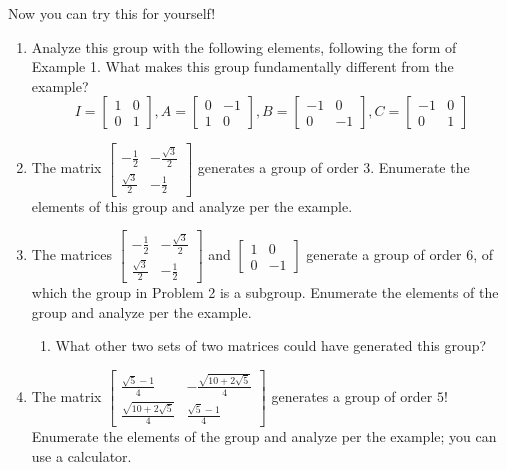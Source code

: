\documentclass[../gatm.tex]{subfiles}
\begin{document}
\noindent Now you can try this for yourself!
\begin{enumerate}
\item Analyze this group with the following elements, following the form of Example 1. What makes this group fundamentally different from the example?
$$I=\left[\begin{array}{cc} 1 & 0 \\ 0 & 1 \end{array}\right], A=\left[\begin{array}{cc} 0 & -1 \\ 1 & 0 \end{array}\right], B=\left[\begin{array}{cc} -1 & 0 \\ 0 & -1 \end{array}\right], C=\left[\begin{array}{cc} -1 & 0 \\ 0 & 1 \end{array}\right]$$
\item The matrix $\left[\begin{array}{cc} -\frac{1}{2} & -\frac{\sqrt{3}}{2} \\ \frac{\sqrt{3}}{2} & -\frac{1}{2}\end{array}\right]$ generates a group of order $3$. Enumerate the elements of this group and analyze per the example.
\item The matrices $\left[\begin{array}{cc} -\frac{1}{2} & -\frac{\sqrt{3}}{2} \\ \frac{\sqrt{3}}{2} & -\frac{1}{2}\end{array}\right]$ and $\left[\begin{array}{cc} 1 & 0 \\ 0 & -1 \end{array}\right]$ generate a group of order $6$, of which the group in Problem 2 is a subgroup. Enumerate the elements of the group and analyze per the example.
\begin{enumerate}
\item What other two sets of two matrices could have generated this group?
\end{enumerate}
\item The matrix $\left[\begin{array}{cc} \frac{\sqrt{5}-1}{4} & -\frac{\sqrt{10+2\sqrt{5}}}{4} \\ \frac{\sqrt{10+2\sqrt{5}}}{4} & \frac{\sqrt{5}-1}{4} \end{array}\right]$ generates a group of order $5$! Enumerate the elements of the group and analyze per the example; you can use a calculator.

\end{enumerate}
\end{document}
